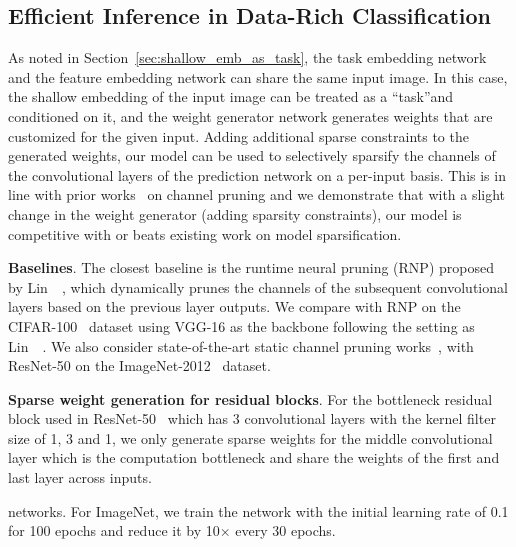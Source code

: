 \documentclass[10pt,twocolumn,letterpaper]{article}
\newcommand{\model}{TAFE-Net\xspace}
\newcommand\minisection[1]{\vspace{2mm}\noindent \textbf{#1}}
\begin{document}
\subsection{Efficient Inference in Data-Rich Classification}\label{sec:efficient_inference}
As noted in Section~\ref{sec:shallow_emb_as_task}, the task embedding
network and the feature embedding network can share the same input image. 
In this case, the shallow embedding of the input image can be treated as a
``task''and conditioned on it, and the weight generator network generates weights that
are customized for the given input. Adding additional sparse constraints to 
the generated weights, our model can be used to selectively sparsify the channels
of the convolutional layers of the prediction network on a per-input basis. This
is in line with prior works~\cite{lin2017runtime, luo2017thinet, he2017channel} on channel pruning and we demonstrate that with a slight
change in the weight generator (adding sparsity constraints), our model is 
competitive with or beats existing work on model 
sparsification. 

\minisection{Baselines}. The closest baseline is the runtime neural pruning (RNP) 
proposed by Lin~\etal~\cite{lin2017runtime}, which dynamically prunes the channels
of the subsequent convolutional layers based on the previous layer outputs. We
compare with RNP on the CIFAR-100~\cite{krizhevsky2009learning} dataset using VGG-16 as the backbone following the setting as Lin~\etal~\cite{lin2017runtime}. We also
consider state-of-the-art static channel pruning works~\cite{he2017channel, luo2017thinet,huang2017data, li2016pruning}, with ResNet-50 on the 
ImageNet-2012~\cite{russakovsky2015imagenet} dataset.

\minisection{Sparse weight generation for residual blocks}. For the bottleneck residual block used in ResNet-50~\cite{he2016deep} which has 3 convolutional layers with the kernel filter
size of 1, 3 and 1, we only generate sparse
weights for the middle convolutional layer which is the computation bottleneck and share the weights of the first and last layer across inputs.

networks. For ImageNet, we train the network with the initial learning rate of 0.1 for 100 epochs and reduce it by 10$\times$ every 30 epochs.
\end{document}
